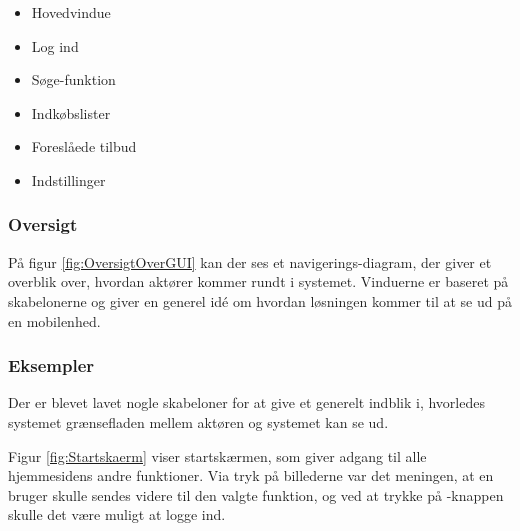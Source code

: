 \begin{itemize}
	\item Hovedvindue
	\item Log ind
	\item Søge-funktion
	\item Indkøbslister
	\item Foreslåede tilbud
	\item Indstillinger
\end{itemize}


\subsubsection{Oversigt}
På figur \ref{fig:OversigtOverGUI} kan der ses et navigerings-diagram, der giver et overblik over, hvordan aktører kommer rundt i systemet. Vinduerne er baseret på skabelonerne og giver en generel idé om hvordan løsningen kommer til at %
se ud på en mobilenhed. %

\subsubsection{Eksempler}
Der er blevet lavet nogle skabeloner for at give et generelt indblik i, hvorledes systemet grænsefladen mellem aktøren og systemet kan se ud.

Figur \ref{fig:Startskaerm} viser startskærmen, som giver adgang til alle hjemmesidens andre funktioner. Via tryk på billederne var det meningen, at en bruger skulle sendes videre til den valgte funktion, og ved at trykke på -knappen skulle det være muligt at logge ind.

